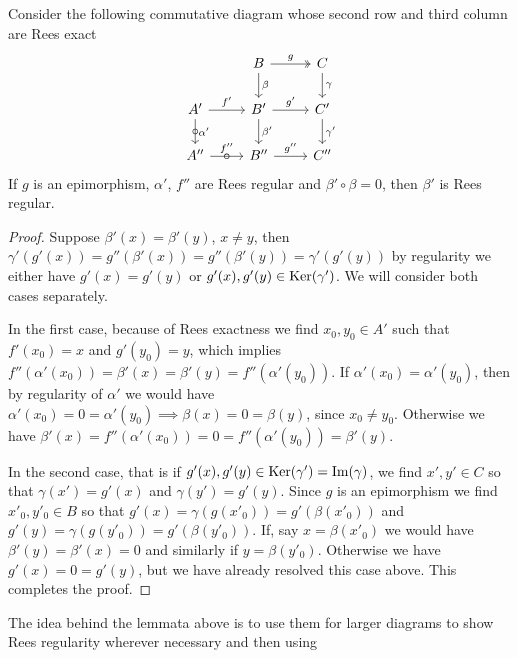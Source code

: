 \begin{lemma}\label{reglemma2}
    Consider the following commutative diagram whose second row and third column are Rees exact
    \[\begin{tikzcd}
        & B & C \\
        {A'} & {B'} & {C'} \\
        {A''} & {B''} & {C''}
        \arrow["g", two heads, from=1-2, to=1-3]
        \arrow["\beta", from=1-2, to=2-2]
        \arrow["\gamma", from=1-3, to=2-3]
        \arrow["{f'}", from=2-1, to=2-2]
        \arrow["{\alpha'}", "\circ"{marking}, from=2-1, to=3-1]
        \arrow["{g'}", from=2-2, to=2-3]
        \arrow["{\beta'}", from=2-2, to=3-2]
        \arrow["{\gamma'}", from=2-3, to=3-3]
        \arrow["{f''}", "\circ"{marking}, from=3-1, to=3-2]
        \arrow["{g''}", from=3-2, to=3-3]
    \end{tikzcd}\]
    If $g$ is an epimorphism, $\alpha'$, $f''$ are Rees regular and $\beta'\circ\beta = 0$, then $\beta'$ is Rees regular.
\end{lemma}
\begin{proof}[Proof]
    Suppose $\beta'(x)=\beta'(y)$, $x\neq y$, then $\gamma'(g'(x))=g''(\beta'(x))=g''(\beta'(y)) = \gamma'(g'(y))$ by 
    regularity we either have $g'(x)=g'(y)$ or $g'(x),g'(y)\in\mathrm{Ker}(\gamma')$. We will consider both cases separately. \par 
    In the first case, because of Rees exactness 
    we find $x_0,y_0\in A'$ such that $f'(x_0)=x$ and $g'(y_0)=y$, which implies 
    $f''(\alpha'(x_0))=\beta'(x)=\beta'(y)=f''(\alpha'(y_0))$. If $\alpha'(x_0)=\alpha'(y_0)$, then by regularity 
    of $\alpha'$ we would have $\alpha'(x_0)=0=\alpha'(y_0) \implies \beta(x)=0=\beta(y)$, since $x_0\neq y_0$.
    Otherwise we have $\beta'(x)=f''(\alpha'(x_0))=0=f''(\alpha'(y_0))=\beta'(y)$.\par
    In the second case, that is if $g'(x),g'(y)\in\mathrm{Ker}(\gamma')=\mathrm{Im}(\gamma)$, we find $x',y'\in C$ so that 
    $\gamma(x')=g'(x)$ and $\gamma(y')=g'(y)$. Since $g$ is an epimorphism we find $x'_0,y'_0\in B$ so that 
    $g'(x) = \gamma(g(x'_0))= g'(\beta(x'_0))$ and $g'(y)=\gamma(g(y'_0))=g'(\beta(y'_0))$. If, say 
    $x = \beta(x'_0)$ we would have $\beta'(y)=\beta'(x)=0$ and similarly if $y=\beta(y'_0)$. Otherwise we have $g'(x)=0=g'(y)$, but we have already resolved this case above. This completes the proof.
\end{proof}
The idea behind the lemmata above is to use them for larger diagrams to show Rees regularity wherever necessary and then using
